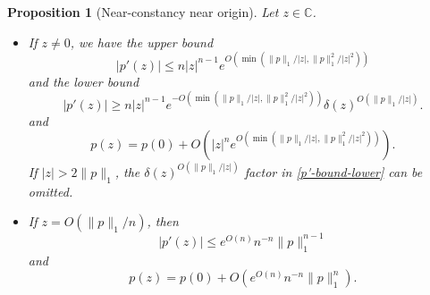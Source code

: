 \documentclass[12pt]{amsart}
\newtheorem{proposition}[theorem]{Proposition}
\newcommand{\C}{\mathbb{C}}
\begin{document}
\begin{proposition}[Near-constancy near origin]\label{pvar}  Let $z \in \C$.
    \begin{itemize}
        \item[(i)]  If $z \neq 0$, we have the upper bound
\begin{equation}\label{p'-bound}
    |p'(z)| \leq n |z|^{n-1} e^{O(\min(\|p\|_1/|z|, \|p\|_1^2/|z|^2))}
\end{equation}
and the lower bound
\begin{equation}\label{p'-bound-lower}
    |p'(z)| \geq n |z|^{n-1} e^{-O(\min(\|p\|_1/|z|, \|p\|_1^2/|z|^2))} \delta(z)^{O(\|p\|_1/|z|)}.
\end{equation}
and
\begin{equation}\label{poz}
     p(z) = p(0) + O(|z|^n e^{O(\min(\|p\|_1/|z|, \|p\|_1^2/|z|^2))}).
\end{equation}
If $|z| > 2\|p\|_1$, the $\delta(z)^{O(\|p\|_1/|z|)}$ factor in \eqref{p'-bound-lower} can be omitted.

\item[(ii)]  If $z = O(\|p\|_1/n)$, then
\begin{equation}\label{ppcl}
     |p'(z)| \leq e^{O(n)} n^{-n} \|p\|_1^{n-1}
\end{equation}
and
\begin{equation}\label{pocl}
     p(z) = p(0) + O(e^{O(n)} n^{-n} \|p\|_1^n).
\end{equation}
\end{itemize}
\end{proposition}
\end{document}
